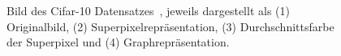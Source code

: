 \begin{figure}[t]
\centering
{}
  \caption[\gls{Cifar}-10]{Bild des \gls{Cifar}-10 Datensatzes~\cite{cifar_10}, jeweils dargestellt als (1) Originalbild, (2) Superpixelrepräsentation, (3) Durchschnittsfarbe der Superpixel und (4) Graphrepräsentation.}
\label{fig:cifar_10}
\end{figure}
